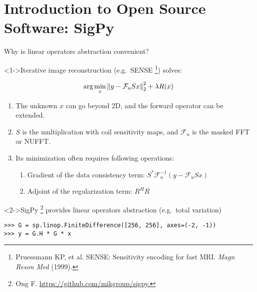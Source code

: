 \section{Introduction to Open Source Software: SigPy}
\begin{frame}[fragile]{Why is linear operators abstraction convenient?}

\begin{block}<1->{Iterative image reconstruction 
		(e.g.~SENSE \footnote{Pruessmann KP, et al. SENSE: Sensitivity encoding for fast MRI. \textit{Magn Reson Med} (1999).}) solves:}
	{\large
	\begin{equation}
		\mathrm{arg}\min_x \left\|y - \mathcal{F}_u S x\right\|_2^2 + \lambda R(x)
	\end{equation}
	\begin{enumerate}[label*=\arabic*.]
		\item The unknown $x$ can go beyond 2D, and the forward operator can be extended.
		\item $S$ is the multiplication with coil sensitivity maps, 
			and $\mathcal{F}_u$ is the masked FFT or NUFFT.
		\item Its minimization often requires following operations:
			\begin{enumerate}[label*=\arabic*.]
				\item Gradient of the data consistency term: $S^* \mathcal{F}_u^{-1} (y - \mathcal{F}_u S x)$
				\item Adjoint of the regularization term: $R^H R$
			\end{enumerate}
	\end{enumerate}}
\end{block}

\begin{block}<2->{SigPy \footnote{Ong F. \url{https://github.com/mikgroup/sigpy.}} provides linear operators abstraction (e.g.~total variation)}
\begin{lstlisting}
>>> G = sp.linop.FiniteDifference([256, 256], axes=(-2, -1))
>>> y = G.H * G * x
\end{lstlisting}
\end{block}


\end{frame}


